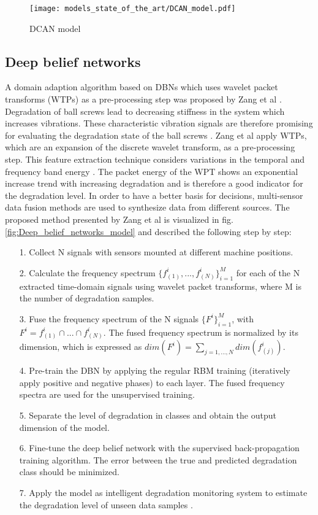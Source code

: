 {\begin{figure}[H]
  \centering
  \texttt{[image: models\_state\_of\_the\_art/DCAN\_model.pdf]}
  \caption{DCAN model \cite{li2020}}
  \label{fig:DCAN_model}
\end{figure}

\subsection{Deep belief networks}
A domain adaption algorithm based on DBNs which uses wavelet packet transforms (WTPs) as a pre-processing step was proposed by Zang et al \cite{Zhang2017}. Degradation of ball screws lead to decreasing stiffness in the system which increases vibrations. These characteristic vibration signals are therefore promising for evaluating the degradation state of the ball screws \cite{Zhang2017}. Zang et al apply WTPs, which are an expansion of the discrete wavelet transform, as a pre-processing step. This feature extraction technique considers variations in the temporal and frequency band energy \cite{Besbes2016}. The packet energy of the WPT shows an exponential increase trend with increasing degradation and is therefore a good indicator for the degradation level. In order to have a better basis for decisions, multi-sensor data fusion methods are used to synthesize data from different sources. The proposed method presented by Zang et al is visualized in fig. \ref{fig:Deep_belief_networks_model} and described the following step by step:

\begin{itemize}
    \item [1.] Collect N signals with sensors mounted at different machine positions.
    \item [2.] Calculate the frequency spectrum $\{f_{(1)}^{i}, ..., f_{(N)}^{i}\}_{i=1}^{M}$ for each of the N extracted time-domain signals using wavelet packet transforms, where M is the number of degradation samples.
    \item [3.] Fuse the frequency spectrum of the N signals $\{F^{i}\}_{i=1}^{M}$, with $F^{i}=f_{(1)}^{i} \cap ... \cap f_{(N)}^{i}$. The fused frequency spectrum is normalized by its dimension, which is expressed as $dim(F^{i})=\sum_{j=1,...,N} dim(f_{(j)}^{i})$.
    \item [4.] Pre-train the DBN by applying the regular RBM training (iteratively apply positive and negative phases) to each layer. The fused frequency spectra are used for the unsupervised training. 
    \item [5.] Separate the level of degradation in classes and obtain the output dimension of the model.
    \item [6.]  Fine-tune the deep belief network with the supervised back-propagation training algorithm. The error between the true and predicted degradation class should be minimized.
    \item [7.] Apply the model as intelligent degradation monitoring system to estimate the degradation level of unseen data samples \cite{Zhang2017}.
\end{itemize}

}
